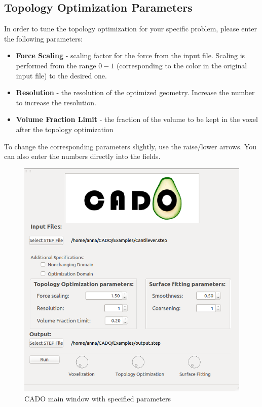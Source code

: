 \documentclass[
12pt, %
a4paper, %
oneside, %
headinclude,footinclude, %
BCOR5mm, %
]{scrartcl}
\begin{document}
\subsection{Topology Optimization Parameters}
In order to tune the topology optimization for your specific problem, please enter the following parameters:
\begin{itemize}
\item \textbf{Force Scaling} - scaling factor for the force from the input file. Scaling is performed from the range $0 - 1$ (corresponding to the color in the original input file) to the desired one.
\item \textbf{Resolution} - the resolution of the optimized geometry. Increase the number to increase the resolution.
\item \textbf{Volume Fraction Limit} - the fraction of the volume to be kept in the voxel after the topology optimization
\end{itemize}

To change the corresponding parameters slightly, use the raise/lower arrows. You can also enter the numbers directly into the fields.

\begin{figure}
\centering
\includegraphics[scale=0.4]{Pictures/CADO_mainWindowParameters.png}
\caption{CADO main window with specified parameters}
\label{fig:mainWindowParameters}
\end{figure}
\end{document}
